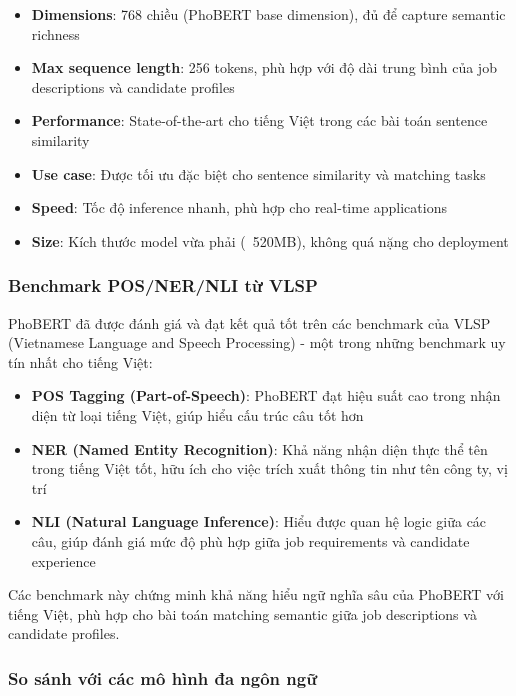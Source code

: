 \begin{itemize}
    \item \textbf{Dimensions}: 768 chiều (PhoBERT base dimension), đủ để capture semantic richness
    \item \textbf{Max sequence length}: 256 tokens, phù hợp với độ dài trung bình của job descriptions và candidate profiles
    \item \textbf{Performance}: State-of-the-art cho tiếng Việt trong các bài toán sentence similarity
    \item \textbf{Use case}: Được tối ưu đặc biệt cho sentence similarity và matching tasks
    \item \textbf{Speed}: Tốc độ inference nhanh, phù hợp cho real-time applications
    \item \textbf{Size}: Kích thước model vừa phải (~520MB), không quá nặng cho deployment
\end{itemize}

\subsubsection{Benchmark POS/NER/NLI từ VLSP}

PhoBERT đã được đánh giá và đạt kết quả tốt trên các benchmark của VLSP (Vietnamese Language and Speech Processing) - một trong những benchmark uy tín nhất cho tiếng Việt:

\begin{itemize}
    \item \textbf{POS Tagging (Part-of-Speech)}: PhoBERT đạt hiệu suất cao trong nhận diện từ loại tiếng Việt, giúp hiểu cấu trúc câu tốt hơn
    \item \textbf{NER (Named Entity Recognition)}: Khả năng nhận diện thực thể tên trong tiếng Việt tốt, hữu ích cho việc trích xuất thông tin như tên công ty, vị trí
    \item \textbf{NLI (Natural Language Inference)}: Hiểu được quan hệ logic giữa các câu, giúp đánh giá mức độ phù hợp giữa job requirements và candidate experience
\end{itemize}

Các benchmark này chứng minh khả năng hiểu ngữ nghĩa sâu của PhoBERT với tiếng Việt, phù hợp cho bài toán matching semantic giữa job descriptions và candidate profiles.

\subsubsection{So sánh với các mô hình đa ngôn ngữ}

